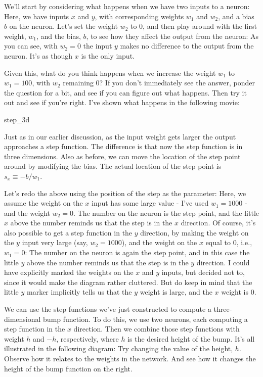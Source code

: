 We'll start by considering what happens when we have two inputs to a neuron: Here, we have inputs $x$ and $y$, with corresponding weights $w_1$ and $w_2$, and a bias $b$ on the neuron. Let's set the weight $w_2$ to $0$, and then play around with the first weight, $w_1$, and the bias, $b$, to see how they affect the output from the neuron: As you can see, with $w_2 = 0$ the input $y$ makes no difference to the output from the neuron. It's as though $x$ is the only input.


Given this, what do you think happens when we increase the weight $w_1$ to $w_1 = 100$, with $w_2$ remaining $0$? If you don't immediately see the answer, ponder the question for a bit, and see if you can figure out what happens. Then try it out and see if you're right. I've shown what happens in the following movie:

\begin{movieNote}{step\_\allowbreak{}3d}
\end{movieNote}

\noindent Just as in our earlier discussion, as the input weight gets larger the output approaches a step function. The difference is that now the step function is in three dimensions. Also as before, we can move the location of the step point around by modifying the bias. The actual location of the step point is $s_x \equiv -b / w_1$.


Let's redo the above using the position of the step as the parameter: Here, we assume the weight on the $x$ input has some large value - I've used $w_1 = 1000$ - and the weight $w_2 = 0$. The number on the neuron is the step point, and the little $x$ above the number reminds us that the step is in the $x$ direction. Of course, it's also possible to get a step function in the $y$ direction, by making the weight on the $y$ input very large (say, $w_2 = 1000$), and the weight on the $x$ equal to $0$, i.e., $w_1 = 0$: The number on the neuron is again the step point, and in this case the little $y$ above the number reminds us that the step is in the $y$ direction. I could have explicitly marked the weights on the $x$ and $y$ inputs, but decided not to, since it would make the diagram rather cluttered. But do keep in mind that the little $y$ marker implicitly tells us that the $y$ weight is large, and the $x$ weight is $0$.


We can use the step functions we've just constructed to compute a three-dimensional bump function. To do this, we use two neurons, each computing a step function in the $x$ direction. Then we combine those step functions with weight $h$ and $-h$, respectively, where $h$ is the desired height of the bump. It's all illustrated in the following diagram: Try changing the value of the height, $h$. Observe how it relates to the weights in the network. And see how it changes the height of the bump function on the right.


